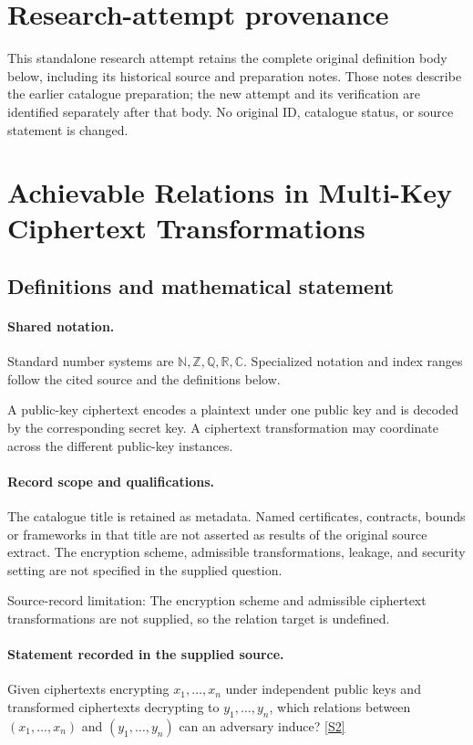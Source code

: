 \documentclass[11pt]{article}
\begin{document}
\section*{Research-attempt provenance}
This standalone research attempt retains the complete original definition body below,
including its historical source and preparation notes. Those notes describe the
earlier catalogue preparation; the new attempt and its verification are identified
separately after that body. No original ID, catalogue status, or source statement is changed.

\section{Achievable Relations in Multi-Key Ciphertext Transformations}\label{statement}

\subsection{Definitions and mathematical statement}

\paragraph{Shared notation.}Standard number systems are $\mathbb N,\mathbb Z,\mathbb Q,\mathbb R,\mathbb C$. Specialized notation and index ranges follow the cited source and the definitions below.


A public-key ciphertext encodes a plaintext under one public key and is decoded by the corresponding secret key. A ciphertext transformation may coordinate across the different public-key instances.
\paragraph{Record scope and qualifications.}
The catalogue title is retained as metadata. Named certificates, contracts, bounds or frameworks in that title are not asserted as results of the original source extract.
The encryption scheme, admissible transformations, leakage, and security setting are not specified in the supplied question.

Source-record limitation: The encryption scheme and admissible ciphertext transformations are not supplied, so the relation target is undefined.
\paragraph{Statement recorded in the supplied source.}
Given ciphertexts encrypting $x_1,\ldots,x_n$ under independent public keys and transformed ciphertexts decrypting to $y_1,\ldots,y_n$, which relations between $(x_1,\ldots,x_n)$ and $(y_1,\ldots,y_n)$ can an adversary induce? \href{https://doi.org/10.4171/owr/2017/5}{[S2]}
\end{document}
